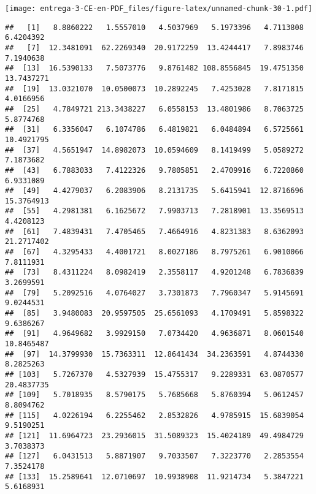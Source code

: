 \documentclass[
]{article}
\newenvironment{Shaded}{\begin{snugshade}}{\end{snugshade}}
\newcommand{\DataTypeTok}[1]{\textcolor[rgb]{0.13,0.29,0.53}{#1}}
\newcommand{\DecValTok}[1]{\textcolor[rgb]{0.00,0.00,0.81}{#1}}
\newcommand{\KeywordTok}[1]{\textcolor[rgb]{0.13,0.29,0.53}{\textbf{#1}}}
\newcommand{\NormalTok}[1]{#1}
\newcommand{\OperatorTok}[1]{\textcolor[rgb]{0.81,0.36,0.00}{\textbf{#1}}}
\newcommand{\StringTok}[1]{\textcolor[rgb]{0.31,0.60,0.02}{#1}}
\begin{document}
\texttt{[image: entrega-3-CE-en-PDF\_files/figure-latex/unnamed-chunk-30-1.pdf]}

\begin{Shaded}
\end{Shaded}

\begin{verbatim}
##   [1]   8.8860222   1.5557010   4.5037969   5.1973396   4.7113808   6.4204392
##   [7]  12.3481091  62.2269340  20.9172259  13.4244417   7.8983746   7.1940638
##  [13]  16.5390133   7.5073776   9.8761482 108.8556845  19.4751350  13.7437271
##  [19]  13.0321070  10.0500073  10.2892245   7.4253028   7.8171815   4.0166956
##  [25]   4.7849721 213.3438227   6.0558153  13.4801986   8.7063725   5.8774768
##  [31]   6.3356047   6.1074786   6.4819821   6.0484894   6.5725661  10.4921795
##  [37]   4.5651947  14.8982073  10.0594609   8.1419499   5.0589272   7.1873682
##  [43]   6.7883033   7.4122326   9.7805851   2.4709916   6.7220860   6.9331089
##  [49]   4.4279037   6.2083906   8.2131735   5.6415941  12.8716696  15.3764913
##  [55]   4.2981381   6.1625672   7.9903713   7.2818901  13.3569513   4.4208123
##  [61]   7.4839431   7.4705465   7.4664916   4.8231383   8.6362093  21.2717402
##  [67]   4.3295433   4.4001721   8.0027186   8.7975261   6.9010066   7.8111931
##  [73]   8.4311224   8.0982419   2.3558117   4.9201248   6.7836839   3.2699591
##  [79]   5.2092516   4.0764027   3.7301873   7.7960347   5.9145691   9.0244531
##  [85]   3.9480083  20.9597505  25.6561093   4.1709491   5.8598322   9.6386267
##  [91]   4.9649682   3.9929150   7.0734420   4.9636871   8.0601540  10.8465487
##  [97]  14.3799930  15.7363311  12.8641434  34.2363591   4.8744330   8.2825263
## [103]   5.7267370   4.5327939  15.4755317   9.2289331  63.0870577  20.4837735
## [109]   5.7018935   8.5790175   5.7685668   5.8760394   5.0612457   8.8094762
## [115]   4.0226194   6.2255462   2.8532826   4.9785915  15.6839054   9.5190251
## [121]  11.6964723  23.2936015  31.5089323  15.4024189  49.4984729   3.7038373
## [127]   6.0431513   5.8871907   9.7033507   7.3223770   2.2853554   7.3524178
## [133]  15.2589641  12.0710697  10.9938908  11.9214734   5.3847221   5.6168931

\end{verbatim}
\end{document}
